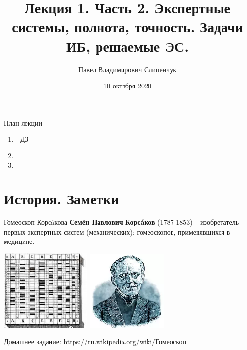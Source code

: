 


\title{Лекция 1. Часть 2. Экспертные системы, полнота, точность. Задачи ИБ, решаемые ЭС.}
\date{10 октября 2020}
\author{Павел Владимирович Слипенчук}


  \maketitle
    
  \begin{frame}{План лекции}
    \begin{enumerate}
    \item {} - ДЗ
    \item {}
    \item {}
	\end{enumerate}
 \end{frame}
 
 \section{История. Заметки}\label{section:history_remarks}
  
  \begin{frame}{Гомеоскоп Корсáкова}
    \textbf{Семён Павлович Корсáков}
    (1787-1853) 
    -- изобретатель первых экспертных систем 
    (механических): гомеоскопов, применявшихся в медицине.  
    \begin{center}
    		\includegraphics[width=4.5cm]{../pic/gomeoskop.png}\centering
    		\includegraphics[width=4cm]{../pic/korsakov.png}\centering
    \end{center}
    Домашнее задание: \url{https://ru.wikipedia.org/wiki/Гомеоскоп}
  \end{frame}
  

